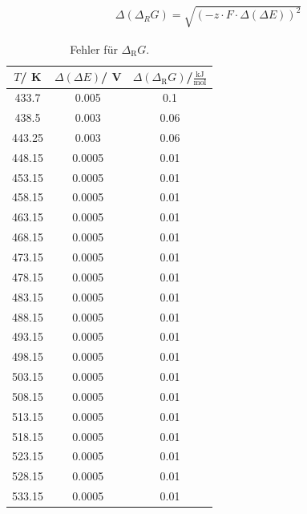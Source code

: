 \documentclass[12pt,a4paper,titlepage,headinclude,bibtotoc]{scrartcl}
\begin{document}
\begin{align}
\Delta(\Delta_R G)= \sqrt{(-z\cdot F \cdot \Delta(\Delta E))^2}
\end{align}
\begin{table}[h]
\centering
\caption{Fehler für $\Delta_\text{R} G$.}
\begin{tabular}{c|c|c}
$T$/ K & $\Delta(\Delta E)$/ V & $\Delta(\Delta_\text{R} G)$/\;$\frac{\text{kJ}}{\text{mol}}$ \\
\hline
433.7 &  0.005 &  0.1  \\
438.5 & 0.003   & 0.06 \\
443.25 & 0.003  & 0.06 \\
448.15 &  0.0005& 0.01 \\
453.15 & 0.0005& 0.01 \\
458.15 &  0.0005& 0.01 \\
463.15 & 0.0005& 0.01 \\
468.15 & 0.0005& 0.01 \\
473.15 & 0.0005& 0.01 \\
478.15 & 0.0005& 0.01 \\
483.15 & 0.0005& 0.01 \\
488.15 & 0.0005& 0.01 \\
493.15 & 0.0005& 0.01 \\
498.15 & 0.0005& 0.01 \\
503.15 & 0.0005& 0.01 \\
508.15 & 0.0005& 0.01 \\
513.15 & 0.0005& 0.01 \\
518.15 & 0.0005& 0.01 \\
523.15 & 0.0005& 0.01 \\
528.15 & 0.0005& 0.01 \\
533.15 & 0.0005& 0.01 \\
\end{tabular}
\end{table}
\FloatBarrier
\end{document}
